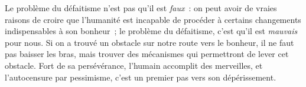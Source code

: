 \documentclass[a5paper,french,openany]{memoir}
\begin{document}

Le problème du défaitisme n'est pas qu'il est \textit{faux}~: on peut avoir de vraies raisons de croire que l'humanité est %
incapable de procéder à certains changements indispensables à son bonheur~; le problème du défaitisme, c'est qu'il est \textit{mauvais} pour nous. Si on a trouvé un obstacle sur notre route vers le bonheur, il ne faut pas baisser les bras, mais trouver des mécanismes qui permettront de lever cet obstacle. Fort de sa persévérance, l'humain accomplit des merveilles, et l'autocensure par pessimisme, c'est un premier pas vers son dépérissement. 
\end{document}
